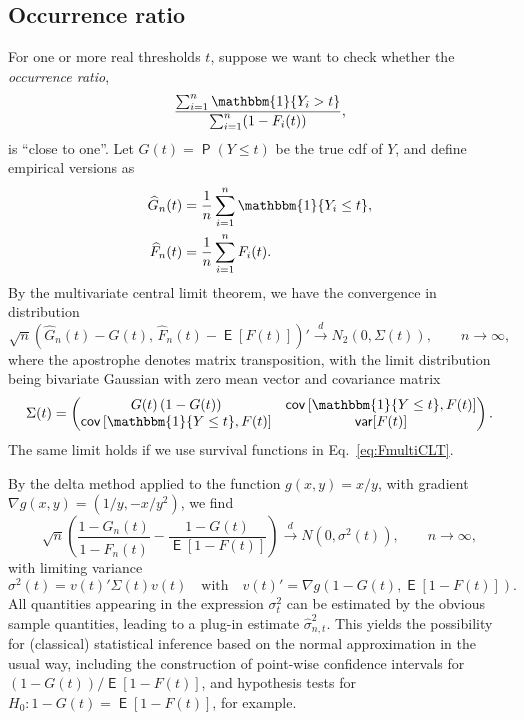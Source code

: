 \documentclass[12pt]{article}
\newcommand{\one}{\mathbbm{1}}
\newcommand{\Q}{\operatorname{\mathsf{P}}}
\newcommand{\expec}{\operatorname{\mathsf{E}}} %
\newcommand{\cov}{\operatorname{\mathsf{cov}}}
\newcommand{\var}{\operatorname{\mathsf{var}}}
\newcommand{\1}{\mathbf{1}} %
\theoremstyle{definition}
\begin{document}
\subsection{Occurrence ratio}

For one or more real thresholds $t$, suppose we want to check whether the \emph{occurrence ratio},
\begin{equation*}
	\frac{\sum_{i=1}^{n} \one\{ Y_{i} > t\}}{\sum_{i=1}^{n} (1 - F_{i}(t))},
\end{equation*}
is ``close to one''. Let $G(t) = \Q(Y \le t)$ be the true cdf of $Y$, and define empirical versions as
\begin{align*}
    \widehat{G}_n(t) &= \frac{1}{n} \sum_{i=1}^n \one\{ Y_i \le t \}, \\
    \widehat{F}_n(t) &= \frac{1}{n} \sum_{i=1}^n F_i(t).
\end{align*}
By the multivariate central limit theorem, we have the convergence in distribution
\begin{equation}
\label{eq:FmultiCLT}
    \sqrt{n} \left( 
        \widehat{G}_n(t) - G(t), \, 
        \widehat{F}_n(t) - \expec[F(t)] 
    \right)'
    \xrightarrow{d}
    N_2(0, \Sigma(t)), \qquad n \to \infty,
\end{equation}
where the apostrophe denotes matrix transposition, with the limit distribution being bivariate Gaussian with zero mean vector and covariance matrix
\[
    \Sigma(t) = \begin{pmatrix}
        G(t) \left( 1 - G(t) \right) &
        \cov \left[ \one\{Y \le t\}, F(t) \right] \\
        \cov \left[ \one\{Y \le t\}, F(t) \right] & \var[F(t)]
    \end{pmatrix}.
\]
The same limit holds if we use survival functions in Eq.~\eqref{eq:FmultiCLT}.

By the delta method applied to the function $g(x, y) = x/y$, with gradient $\nabla g(x, y) = (1/y, -x/y^2)$, we find
\begin{equation}
    \label{eq:occratCLT}
    \sqrt{n} \left(
        \frac{1-\widehat{G}_n(t)}{1-\widehat{F}_n(t)} - 
        \frac{1-G(t)}{\expec[1-F(t)]}
    \right)
    \xrightarrow{d}
    N(0, \sigma^2(t)), \qquad n \to \infty,
\end{equation}
with limiting variance
\[
    \sigma^2(t)
    = v(t)' \Sigma(t) v(t)
    \quad \text{with} \quad
    v(t)' = \nabla g \left( 1-G(t), \expec[1-F(t)] \right).
\]
All quantities appearing in the expression $\sigma^2_t$ can be estimated by the obvious sample quantities, leading to a plug-in estimate $\hat{\sigma}^2_{n,t}$. This yields the possibility for (classical) statistical inference based on the normal approximation in the usual way, including the construction of point-wise confidence intervals for $(1 - G(t)) / \expec[1-F(t)]$, and hypothesis tests for $H_0 : 1 - G(t) = \expec[1 - F(t)]$, for example.
\end{document}
